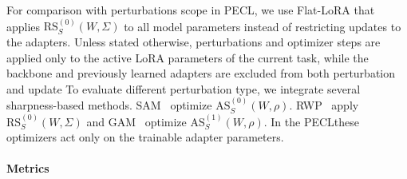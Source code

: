 \documentclass{article}
\theoremstyle{plain}
\theoremstyle{definition}
\theoremstyle{remark}
\begin{document}
For comparison with perturbations scope in PECL, we use Flat-LoRA \cite{li2025flatloralowrankadaptationflat} that applies $\mathrm{RS}_S^{(0)}({W}, \Sigma)$ to all model parameters instead of restricting updates to the adapters. Unless stated otherwise, perturbations and optimizer steps are applied only to the active LoRA parameters of the current task, while the backbone and previously learned adapters are excluded from both perturbation and update
To evaluate different perturbation type, we integrate several sharpness-based methods. 
SAM~\cite{foretSharpnessAwareMinimizationEfficiently2021} optimize $\mathrm{AS}^{(0)}_S(W,\rho)$. RWP~\cite{pmlr-v151-bisla22a} apply $\mathrm{RS}_S^{(0)}({W}, \Sigma)$ and GAM~\cite{zhangGradientNormAware2023} optimize $\mathrm{AS}^{(1)}_S(W,\rho)$. In the PECLthese optimizers act only on the trainable adapter parameters. 

\paragraph{Metrics}

\end{document}
